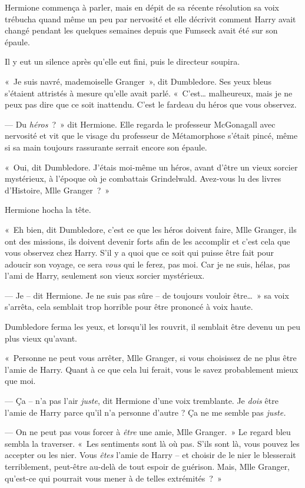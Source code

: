 Hermione commença à parler, mais en dépit de sa récente résolution sa voix trébucha quand même un peu par nervosité et elle décrivit comment Harry avait changé pendant les quelques semaines depuis que Fumseck avait été sur son épaule.

Il y eut un silence après qu'elle eut fini, puis le directeur soupira.

«~Je suis navré, mademoiselle Granger~», dit Dumbledore.
Ses yeux bleus s'étaient attristés à mesure qu'elle avait parlé.
«~C'est… malheureux, mais je ne peux pas dire que ce soit inattendu.
C'est le fardeau du héros que vous observez.

--- Du \emph{héros}~?~»
dit Hermione.
Elle regarda le professeur McGonagall avec nervosité et vit que le visage du professeur de Métamorphose s'était pincé, même si sa main toujours rassurante serrait encore son épaule.

«~Oui, dit Dumbledore.
J'étais moi-même un héros, avant d'être un vieux sorcier mystérieux, à l'époque où je combattais Grindelwald.
Avez-vous lu des livres d'Histoire, Mlle Granger~?~»

Hermione hocha la tête.

«~Eh bien, dit Dumbledore, c'est ce que les héros doivent faire, Mlle Granger, ils ont des missions, ils doivent devenir forts afin de les accomplir et c'est cela que vous observez chez Harry.
S'il y a quoi que ce soit qui puisse être fait pour adoucir son voyage, ce sera \emph{vous} qui le ferez, pas moi.
Car je ne suis, hélas, pas l'ami de Harry, seulement son vieux sorcier mystérieux.

--- Je -- dit Hermione.
Je ne suis pas sûre -- de toujours vouloir être…~»
sa voix s'arrêta, cela semblait trop horrible pour être prononcé à voix haute.

Dumbledore ferma les yeux, et lorsqu'il les rouvrit, il semblait être devenu un peu plus vieux qu'avant.

«~Personne ne peut vous arrêter, Mlle Granger, si vous choisissez de ne plus être l'amie de Harry.
Quant à ce que cela lui ferait, vous le savez probablement mieux que moi.

--- Ça -- n'a pas l'air \emph{juste}, dit Hermione d'une voix tremblante.
Je \emph{dois} être l'amie de Harry parce qu'il n'a personne d'autre ?
Ça ne me semble pas \emph{juste.}

--- On ne peut pas vous forcer à \emph{être} une amie, Mlle Granger.~»
Le regard bleu sembla la traverser.
«~Les sentiments sont là où pas.
S'ils sont là, vous pouvez les accepter ou les nier.
Vous \emph{êtes} l'amie de Harry -- et choisir de le nier le blesserait terriblement, peut-être au-delà de tout espoir de guérison.
Mais, Mlle Granger, qu'est-ce qui pourrait vous mener à de telles extrémités~?~»

